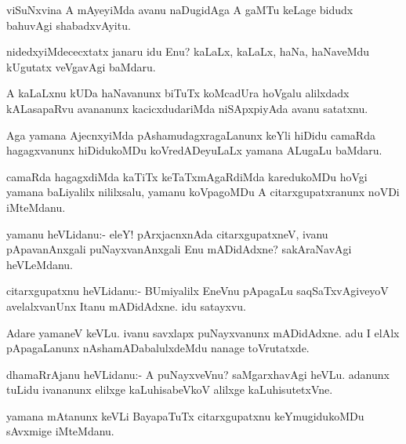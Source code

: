 \begin{mng}
viSuNxvina A mAyeyiMda avanu naDugidAga A gaMTu keLage bidudx bahuvAgi shabadxvAyitu.
\end{mng}

\begin{mng}
nidedxyiMdececxtatx janaru idu Enu? kaLaLx, kaLaLx, haNa, haNaveMdu kUgutatx veVgavAgi baMdaru.
\end{mng}

\begin{mng}
A kaLaLxnu kUDa haNavanunx biTuTx koMcadUra hoVgalu alilxdadx kALasapaRvu avananunx kacicxdudariMda niSApxpiyAda avanu satatxnu.
\end{mng}

\begin{mng}
Aga yamana AjecnxyiMda pAshamudagxragaLanunx keYli hiDidu camaRda hagagxvanunx hiDidukoMDu koVredADeyuLaLx yamana ALugaLu baMdaru.
\end{mng}

\begin{mng}
camaRda hagagxdiMda kaTiTx keTaTxmAgaRdiMda karedukoMDu hoVgi yamana baLiyalilx nililxsalu, yamanu koVpagoMDu A citarxgupatxranunx noVDi iMteMdanu.
\end{mng}

\begin{mng}
yamanu heVLidanu:- eleY! pArxjacnxnAda citarxgupatxneV, ivanu pApavanAnxgali puNayxvanAnxgali Enu mADidAdxne? sakAraNavAgi heVLeMdanu.
\end{mng}

\begin{mng}
citarxgupatxnu heVLidanu:- BUmiyalilx EneVnu pApagaLu saqSaTxvAgiveyoV avelalxvanUnx Itanu mADidAdxne. idu satayxvu.
\end{mng}

\begin{mng}
Adare yamaneV keVLu. ivanu savxlapx puNayxvanunx mADidAdxne. adu I elAlx pApagaLanunx nAshamADabalulxdeMdu nanage toVrutatxde.
\end{mng}

\begin{mng}
dhamaRrAjanu heVLidanu:- A puNayxveVnu? saMgarxhavAgi heVLu. adanunx tuLidu ivananunx elilxge kaLuhisabeVkoV alilxge kaLuhisutetxVne.
\end{mng}

\begin{mng}
yamana mAtanunx keVLi BayapaTuTx citarxgupatxnu keYmugidukoMDu sAvxmige iMteMdanu.
\end{mng}

